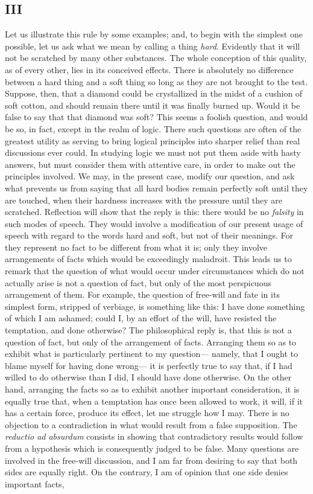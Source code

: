 \subsection*{III}

Let us illustrate this rule by some examples; and, to begin with the simplest one possible, let us ask what we mean by calling a thing \emph{hard}. Evidently that it will not be scratched by many other substances. The whole conception of this quality, as of every other, lies in its conceived effects. There is absolutely no difference between a hard thing and a soft thing so long as they are not brought to the test. Suppose, then, that a diamond could be crystallized in the midst of a cushion of soft cotton, and should remain there until it was finally burned up. Would it be false to say that that diamond was soft? This seems a foolish question, and would be so, in fact, except in the realm of logic. There such questions are often of the greatest utility as serving to bring logical principles into sharper relief than real discussions ever could. In studying logic we must not put them aside with hasty answers, but must consider them with attentive care, in order  to make out the principles involved. We may, in the present case, modify our question, and ask what prevents us from saying that all hard bodies remain perfectly soft until they are touched, when their hardness increases with the pressure until they are scratched. Reflection will show that the reply is this: there would be no \emph{falsity} in such modes of speech. They would involve a modification of our present usage of speech with regard to the words hard and soft, but not of their meanings. For they represent no fact to be different from what it is; only they involve arrangements of facts which would be exceedingly maladroit. This leads us to remark that the question of what would occur under circumstances which do not actually arise is not a question of fact, but only of the most perspicuous arrangement of them. For example, the question of free-will and fate in its simplest form, stripped of verbiage, is something like this: I have done something of which I am ashamed; could I, by an effort of the will, have resisted the temptation, and done otherwise? The philosophical reply is, that this is not a question of fact, but only of the arrangement of facts. Arranging them so as to exhibit what is particularly pertinent to my question--- namely, that I ought to blame myself for having done wrong--- it is perfectly true to say that, if I had willed to do otherwise than I did, I should have done otherwise. On the other hand, arranging the facts so as to exhibit another important consideration, it is equally true that, when a temptation has once been allowed to work, it will, if it has a certain force, produce its effect, let me struggle how I may. There is no objection to a contradiction in what would result from a false supposition. The \emph{reductio ad absurdum} consists in showing that contradictory results would follow from a hypothesis which is consequently judged to be false. Many questions are involved in the free-will discussion, and I am far from desiring to say that both sides are equally right. On the contrary, I am of opinion that one side denies important facts, 